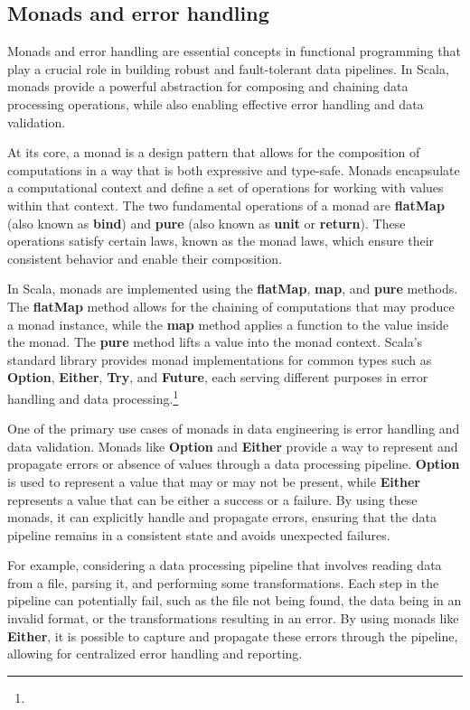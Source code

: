 \subsection{Monads and error handling}

Monads and error handling are essential concepts in functional programming that play a crucial role in building robust and fault-tolerant data pipelines. In Scala, monads provide a powerful abstraction for composing and chaining data processing operations, while also enabling effective error handling and data validation.\footnotemark {}

At its core, a monad is a design pattern that allows for the composition of computations in a way that is both expressive and type-safe. Monads encapsulate a computational context and define a set of operations for working with values within that context. The two fundamental operations of a monad are \textbf{flatMap} (also known as \textbf{bind}) and \textbf{pure} (also known as \textbf{unit} or \textbf{return}). These operations satisfy certain laws, known as the monad laws, which ensure their consistent behavior and enable their composition.\footnotemark[14]

In Scala, monads are implemented using the \textbf{flatMap}, \textbf{map}, and \textbf{pure} methods. The \textbf{flatMap} method allows for the chaining of computations that may produce a monad instance, while the \textbf{map} method applies a function to the value inside the monad. The \textbf{pure} method lifts a value into the monad context. Scala's standard library provides monad implementations for common types such as \textbf{Option}, \textbf{Either}, \textbf{Try}, and \textbf{Future}, each serving different purposes in error handling and data processing.\footnote[3]{}

One of the primary use cases of monads in data engineering is error handling and data validation. Monads like \textbf{Option} and \textbf{Either} provide a way to represent and propagate errors or absence of values through a data processing pipeline. \textbf{Option} is used to represent a value that may or may not be present, while \textbf{Either} represents a value that can be either a success or a failure. By using these monads,  it can explicitly handle and propagate errors, ensuring that the data pipeline remains in a consistent state and avoids unexpected failures.\footnotemark[3]

For example, considering a data processing pipeline that involves reading data from a file, parsing it, and performing some transformations. Each step in the pipeline can potentially fail, such as the file not being found, the data being in an invalid format, or the transformations resulting in an error. By using monads like \textbf{Either}, it is possible to capture and propagate these errors through the pipeline, allowing for centralized error handling and reporting.\footnotemark[3]

